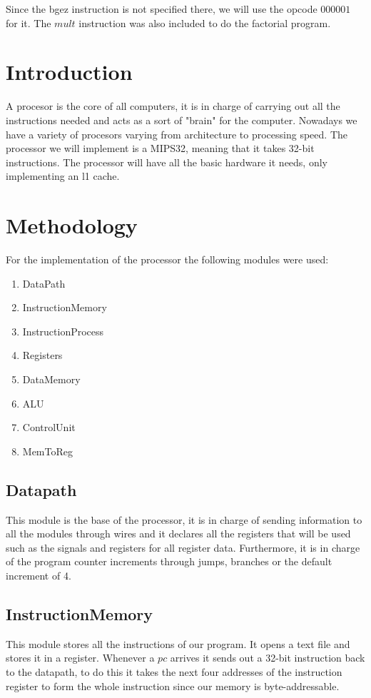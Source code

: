 \documentclass[12pt,a4paper]{article}
\begin{document}
Since the bgez instruction is not specified there, we will use the opcode $000001$ for it. The $mult$ instruction was also included to do the factorial program.

\section{Introduction}
A procesor is the core of all computers, it is in charge of carrying out all the instructions needed and acts as a sort of "brain" for the computer. Nowadays we have a variety of procesors varying from architecture to processing speed. The processor we will implement is a MIPS32, meaning that it takes 32-bit instructions. The processor will have all the basic hardware it needs, only implementing an l1 cache.



\section{Methodology}
For the implementation of the processor the following modules were used:
\begin{enumerate}
\item DataPath
\item InstructionMemory
\item InstructionProcess
\item Registers
\item DataMemory
\item ALU
\item ControlUnit
\item MemToReg
\end{enumerate}

\subsection{Datapath}
\text This module is the base of the processor, it is in charge of sending information to all the modules through wires and it declares all the registers that will be used such as the signals and registers for all register data. Furthermore, it is in charge of the program counter increments through jumps, branches or the default increment of 4.

\subsection{InstructionMemory}
\text This module stores all the instructions of our program. It opens a text file and stores it in a register. Whenever a $pc$ arrives it sends out a 32-bit instruction back to the datapath, to do this it takes the next four addresses of the instruction register to form the whole instruction since our memory is byte-addressable.
\end{document}
